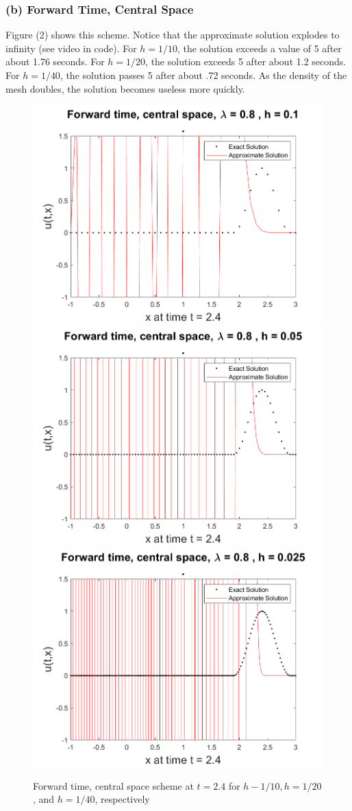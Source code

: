 \documentclass[12pt]{article}
\begin{document}
\subsubsection*{(b) Forward Time, Central Space}
\vspace{-1mm}
Figure (2) shows this scheme. Notice that the approximate solution explodes to infinity  (see video in code). For $h=1/10$, the solution exceeds a value of 5 after about 1.76 seconds. For $h=1/20$, the solution exceeds 5 after about 1.2 seconds. For $h=1/40$, the solution passes 5 after about .72 seconds. As the density of the mesh doubles, the solution becomes useless more quickly.

\begin{figure}
	\centering
	\includegraphics[width=.6\linewidth]{./code/b_forward_time_central_space_1_10th.png}	\includegraphics[width=.6\linewidth]{./code/b_forward_time_central_space_1_20th.png}
	\includegraphics[width=.6\linewidth]{./code/b_forward_time_central_space_1_40th.png}
	\caption{Forward time, central space scheme at $t=2.4$ for $h-1/10, h=1/20$, and $h=1/40$, respectively}
\end{figure}
\end{document}
